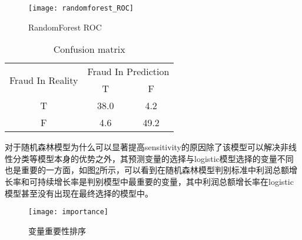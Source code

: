 \begin{figure}[!ht]
    \centering
    \texttt{[image: randomforest\_ROC]}
    \caption{RandomForest ROC} \label{randomforest_ROC}
    \end{figure}

\begin{table}[!ht]
    \centering
    \caption{Confusion matrix}
    \label{confusion_}
    \begin{tabular}{ccc}
    \hline
    \multirow{2}{*}{Fraud In Reality} & \multicolumn{2}{c}{Fraud In Prediction} \\ \cline{2-3} 
                                      & T                  & F                  \\ \hline
    T                                 & 38.0               & 4.2                \\
    F                                 & 4.6                & 49.2               \\ \hline
    \end{tabular}
    \end{table}


对于随机森林模型为什么可以显著提高sensitivity的原因除了该模型可以解决非线性分类等模型本身的优势之外，其预测变量的选择与logistic模型选择的变量不同也是重要的一方面，如图\ref{importance}所示，可以看到在随机森林模型判别标准中利润总额增长率和可持续增长率是判别模型中最重要的变量，其中利润总额增长率在logistic模型甚至没有出现在最终选择的模型中。


\begin{figure}[!ht]
    \centering
    \texttt{[image: importance]}
    \caption{变量重要性排序} \label{importance}
    \end{figure}